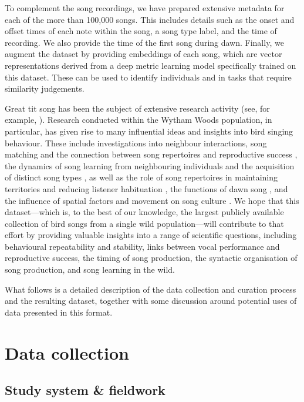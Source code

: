 To complement the song recordings, we have prepared extensive metadata for each of the more than 100,000 songs. This includes details such as the onset and offset times of each note within the song, a song type label, and the time of recording. We also provide the time of the first song during dawn. Finally, we augment the dataset by providing embeddings of each song, which are vector representations derived from a deep metric learning model specifically trained on this dataset. These can be used to identify individuals and in tasks that require similarity judgements.

Great tit song has been the subject of extensive research activity (see, for example, \cite{lambrechts1990, lind1996, rivera-gutierrez2010a, rivera-gutierrez2010, rivera-gutierrez2011, slagsvold1994, Ritschard2012}). Research conducted within the Wytham Woods population, in particular, has given rise to many influential ideas and insights into bird singing behaviour. These include investigations into neighbour interactions, song matching and the connection between song repertoires and reproductive success \parencite{mcgregor1981, mcgregor1983, mcgregor1989}, the dynamics of song learning from neighbouring individuals and the acquisition of distinct song types \parencite{mcgregor1989, mcgregor1982b}, as well as the role of song repertoires in maintaining territories and reducing listener habituation \parencite{krebs1976, krebs1978}, the functions of dawn song \parencite{kacelnik1983, mace1987}, and the influence of spatial factors and movement on song culture \parencite{fayet2014}. We hope that this dataset---which is, to the best of our knowledge, the largest publicly available collection of bird songs from a single wild population---will contribute to that effort by providing valuable insights into a range of scientific questions, including behavioural repeatability and stability, links between vocal performance and reproductive success, the timing of song production, the syntactic organisation of song production, and song learning in the wild.

What follows is a detailed description of the data collection and curation process and the resulting dataset, together with some discussion around potential uses of data presented in this format.

\section{Data collection}
\subsection{Study system \& fieldwork}

